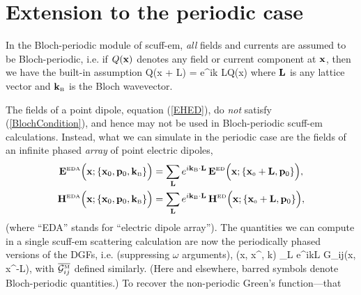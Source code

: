 \documentclass[letterpaper]{article}
\begin{document}
\section{Extension to the periodic case}

In the Bloch-periodic module of {\sc scuff-em}, \textit{all}
fields and currents are assumed to be Bloch-periodic, i.e.
if $Q(\mathbf{x})$ denotes any field or current component at $\mathbf{x}$,
then we have the built-in assumption
{Q(\vb x + \vb L) = e^{i\vb k \cdot \vb L}Q(\vb x)}
where $\mathbf{L}$ is any lattice vector and 
$\mathbf{k}_{\hbox{\tiny{B}}}$ is the Bloch wavevector.

The fields of a point dipole, equation (\ref{EHED}), do \textit{not}
satisfy (\ref{BlochCondition}), and hence may not be used in
Bloch-periodic {\sc scuff-em} calculations. Instead, what we can 
simulate in the periodic case are the fields of an infinite
phased \textit{array} of point electric dipoles,
\begin{subequations}
\begin{align}
 \mathbf{E}^{\hbox{\tiny{EDA}}}\Big(\mathbf{x}; \{ \mathbf{x}_0, \mathbf{p}_0, \mathbf{k}_{\hbox{\tiny{B}}}\}\Big)
&=\sum_{\mathbf{L}} e^{i\mathbf{k}_{\hbox{\tiny{B}}}\cdot \mathbf{L}}
  \, \mathbf{E}^{\hbox{\tiny{ED}}}\Big(\mathbf{x}; \{\mathbf{x}_{\hbox{\tiny{0}}}+\mathbf{L}, \mathbf{p}_0\} \Big),
\\
 \mathbf{H}^{\hbox{\tiny{EDA}}}\Big(\mathbf{x}; \{ \mathbf{x}_0, \mathbf{p}_0, \mathbf{k}_{\hbox{\tiny{B}}}\}\Big)
&=\sum_{\mathbf{L}} e^{i\mathbf{k}_{\hbox{\tiny{B}}}\cdot \mathbf{L}}
  \, \mathbf{H}^{\hbox{\tiny{ED}}}\Big(\mathbf{x}; \{\mathbf{x}_{\hbox{\tiny{0}}}+\mathbf{L}, \mathbf{p}_0\} \Big),
\end{align}
\label{EHEDA}
\end{subequations}
(where ``EDA'' stands for ``electric dipole array''). The quantities
we can compute in a single {\sc scuff-em} scattering calculation
are now the periodically phased versions of the DGFs, i.e.
(suppressing $\omega$ arguments),
{
 (\vb x, \vb x^\prime, \vb k)
 \equiv \sum_{\vb L} e^{i\vb k\cdot \vb L}
  \mc G_{ij}(\vb x, \vb x^\prime-\vb L), 
}
with $\overline{\mathcal{G}_{ij}^{\hbox{\tiny{M}}}}$ defined similarly.
(Here and elsewhere, barred symbols denote Bloch-periodic 
quantities.) To recover the non-periodic Green's function---that
\end{document}
